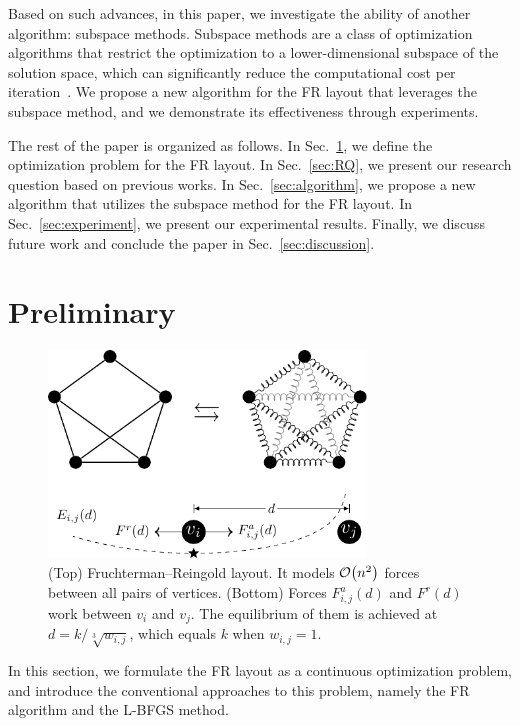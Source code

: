 \documentclass[dvipdfmx,lettersize,journal]{IEEEtran}
\begin{document}
Based on such advances, in this paper, we investigate the ability of another algorithm: subspace methods.
Subspace methods are a class of optimization algorithms that restrict the optimization to a lower-dimensional subspace of the solution space, which can significantly reduce the computational cost per iteration~\cite{NEURIPS2019_bc6dc48b}.
We propose a new algorithm for the FR layout that leverages the subspace method, and we demonstrate its effectiveness through experiments.

The rest of the paper is organized as follows.
In Sec.~\ref{sec:preliminary}, we define the optimization problem for the FR layout.
In Sec.~\ref{sec:RQ}, we present our research question based on previous works.
In Sec.~\ref{sec:algorithm}, we propose a new algorithm that utilizes the subspace method for the FR layout.
In Sec.~\ref{sec:experiment}, we present our experimental results.
Finally, we discuss future work and conclude the paper in Sec.~\ref{sec:discussion}.

\section{Preliminary}\label{sec:preliminary}

\begin{figure}[t]
  \centering
  \includegraphics[height=5.5cm]{fr_layout/fr_layout.pdf}
  \caption{
    (Top) Fruchterman--Reingold layout. It models $\order{n^2}$ forces between all pairs of vertices.
    (Bottom) Forces $F_{i,j}^a(d)$ and $F^r(d)$ work between $v_i$ and $v_j$. The equilibrium of them is achieved at $d = k/\sqrt[3]{w_{i,j}}$, which equals $k$ when $w_{i,j} = 1$.
  }
  \label{fig:frLayout}
\end{figure}

In this section, we formulate the FR layout as a continuous optimization problem, and introduce the conventional approaches to this problem, namely the FR algorithm and the L-BFGS method.
\end{document}
